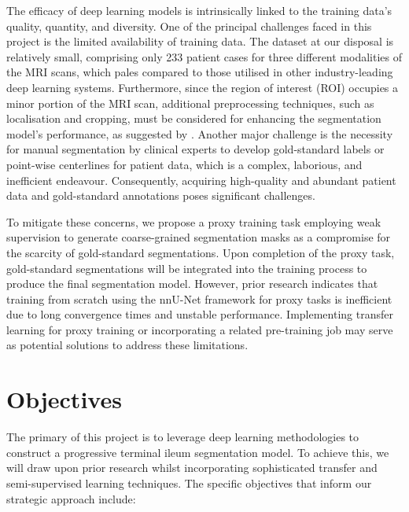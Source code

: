 The efficacy of deep learning models is intrinsically linked to the training data's quality, quantity, and diversity. One of the principal challenges faced in this project is the limited availability of training data. The dataset at our disposal is relatively small, comprising only 233 patient cases for three different modalities of the MRI scans, which pales compared to those utilised in other industry-leading deep learning systems. Furthermore, since the region of interest (ROI) occupies a minor portion of the MRI scan, additional preprocessing techniques, such as localisation and cropping, must be considered for enhancing the segmentation model's performance, as suggested by \cite{Ali2022}. Another major challenge is the necessity for manual segmentation by clinical experts to develop gold-standard labels or point-wise centerlines for patient data, which is a complex, laborious, and inefficient endeavour. Consequently, acquiring high-quality and abundant patient data and gold-standard annotations poses significant challenges.

To mitigate these concerns, we propose a proxy training task employing weak supervision to generate coarse-grained segmentation masks as a compromise for the scarcity of gold-standard segmentations. Upon completion of the proxy task, gold-standard segmentations will be integrated into the training process to produce the final segmentation model. However, prior research \cite{Ali2022} indicates that training from scratch using the nnU-Net framework for proxy tasks is inefficient due to long convergence times and unstable performance. Implementing transfer learning for proxy training \cite{jang2021effectiveness} or incorporating a related pre-training job may serve as potential solutions to address these limitations.

\section{Objectives}

The primary of this project is to leverage deep learning methodologies to construct a progressive terminal ileum segmentation model. To achieve this, we will draw upon prior research whilst incorporating sophisticated transfer and semi-supervised learning techniques. The specific objectives that inform our strategic approach include:

